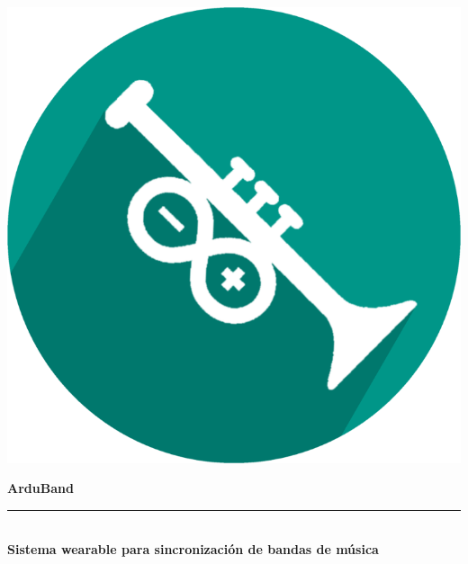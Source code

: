 \begin{titlepage}


\setlength{\centeroffset}{-0.5\oddsidemargin}
\addtolength{\centeroffset}{0.5\evensidemargin}
\thispagestyle{empty}

\noindent\hspace*{\centeroffset}\begin{minipage}{\textwidth}

\centering

%

 \vspace{3.3cm}

\includegraphics{imagenes/logo.png}
 \vspace{0.5cm}


{\Huge\bfseries ArduBand\\
}
\noindent\rule[-1ex]{\textwidth}{3pt}\\[3.5ex]
{\large\bfseries Sistema wearable para sincronización de bandas de música\\[4cm]}
\end{minipage}


\end{titlepage}
